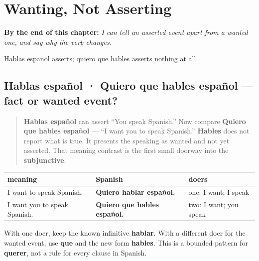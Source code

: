 
\chapter{Wanting, Not Asserting}
\label{ch:spanish-quiero-que}

\begin{chapteropening}
\textbf{By the end of this chapter:} \emph{I can tell an asserted event apart from a wanted one, and say why the verb changes.}

Hablas espanol asserts; quiero que hables asserts nothing at all.
\end{chapteropening}

\section[Hablas español · Quiero que hables …]{Hablas español · Quiero que hables español — fact or wanted event?}

\label{lesson:ES-C18-quiero-que}



\begin{quote}
\textbf{Hablas español} can assert “You speak Spanish.” Now compare \textbf{Quiero que hables español} — “I want you to speak Spanish.” \textbf{Hables} does not report what is true. It presents the speaking as wanted and not yet asserted. That meaning contrast is the first small doorway into the \textbf{subjunctive}.
\end{quote}

\begin{grammarlens}[title={Grammar Lens: count the doers}]
\noindent
\begin{tabularx}{\linewidth}{@{}>{\raggedright\arraybackslash}X>{\raggedright\arraybackslash}X>{\raggedright\arraybackslash}X@{}}
\toprule
\textbf{meaning} & \textbf{Spanish} & \textbf{doers} \\
\midrule
I want to speak Spanish. & \textbf{Quiero hablar español.} & one: I want; I speak \\
I want you to speak Spanish. & \textbf{Quiero que hables español.} & two: I want; you speak \\
\bottomrule
\end{tabularx}

With one doer, keep the known infinitive \textbf{hablar}. With a different doer for the wanted event, use \textbf{que} and the new form \textbf{hables}. This is a bounded pattern for \textbf{querer}, not a rule for every clause in Spanish.
\end{grammarlens}

